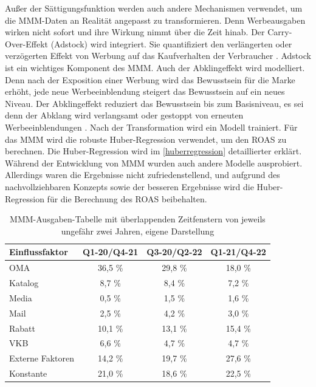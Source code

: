 Außer der Sättigungsfunktion werden auch andere Mechanismen verwendet, um die \ac{MMM}-Daten an Realität angepasst zu transformieren. Denn Werbeausgaben wirken nicht sofort und ihre Wirkung nimmt über die Zeit hinab. Der Carry-Over-Effekt (Adstock) wird integriert. Sie quantifiziert den verlängerten oder verzögerten Effekt von Werbung auf das Kaufverhalten der Verbraucher \cite{broadbent1979}. Adstock ist ein wichtiges Komponent des \ac{MMM}. Auch der Abklingeffekt wird modelliert. Denn nach der Exposition einer Werbung wird das Bewusstsein für die Marke erhöht, jede neue Werbeeinblendung steigert das Bewusstsein auf ein neues Niveau. Der Abklingeffekt reduziert das Bewusstsein bis zum Basisniveau, es sei denn der Abklang wird verlangsamt oder gestoppt von erneuten Werbeeinblendungen \cite{Joseph2006Adstock}. Nach der Transformation wird ein Modell trainiert. Für das \ac{MMM} wird die robuste Huber-Regression verwendet, um den \ac{ROAS} zu berechnen. Die Huber-Regression wird im \autoref{huberregression} detaillierter erklärt. Während der Entwicklung von \ac{MMM} wurden auch andere Modelle ausprobiert. Allerdings waren die Ergebnisse nicht zufriedenstellend, und aufgrund des nachvollziehbaren Konzepts sowie der besseren Ergebnisse wird die Huber-Regression für die Berechnung des \ac{ROAS} beibehalten.
\begin{table}[H]
\centering
\renewcommand{\arraystretch}{1.3}
\setlength{\tabcolsep}{10pt}
\begin{tabular}{|l|c|c|c|}
\hline
\textbf{Einflussfaktor} & \textbf{Q1-20/Q4-21} & \textbf{Q3-20/Q2-22} & \textbf{Q1-21/Q4-22} \\ \hline
OMA                    & 36,5 \%               & 29,8 \%               & 18,0 \%               \\ \hline
Katalog                & 8,7 \%                & 8,4 \%                & 7,2 \%                \\ \hline
Media                  & 0,5 \%                & 1,5 \%                & 1,6 \%                \\ \hline
Mail                   & 2,5 \%                & 4,2 \%                & 3,0 \%                \\ \hline
Rabatt                 & 10,1 \%               & 13,1 \%               & 15,4 \%               \\ \hline
VKB                    & 6,6 \%                & 4,7 \%                & 4,7 \%                \\ \hline
Externe Faktoren       & 14,2 \%               & 19,7 \%               & 27,6 \%               \\ \hline
Konstante              & 21,0 \%               & 18,6 \%               & 22,5 \%               \\ \hline
\end{tabular}
\caption{\ac{MMM}-Ausgaben-Tabelle mit überlappenden Zeitfenstern von jeweils ungefähr zwei Jahren, eigene Darstellung}
\label{tab:mmmausgaben}
\end{table}
